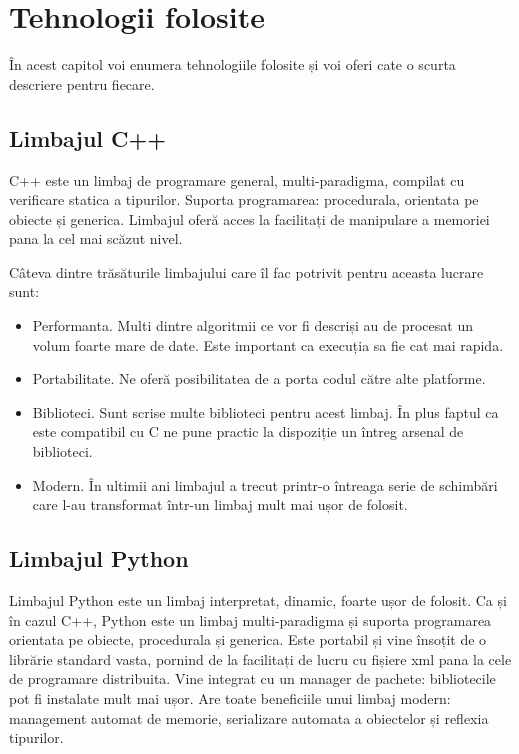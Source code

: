 \chapter{Tehnologii folosite}

În acest capitol voi enumera tehnologiile folosite și voi oferi cate o scurta descriere pentru fiecare.

\section{Limbajul C++}

C++ este un limbaj de programare general, multi-paradigma, compilat cu verificare statica a tipurilor.
Suporta programarea: procedurala, orientata pe obiecte și generica.
Limbajul oferă acces la facilitați de manipulare a memoriei pana la cel mai scăzut nivel.

Câteva dintre trăsăturile limbajului care îl fac potrivit pentru aceasta lucrare sunt:
\begin{itemize}
	\item Performanta. Multi dintre algoritmii ce vor fi descriși au de procesat un volum foarte mare de date. Este important ca execuția sa fie cat mai rapida.
	\item Portabilitate. Ne oferă posibilitatea de a porta codul către alte platforme.
	\item Biblioteci. Sunt scrise multe biblioteci pentru acest limbaj. În plus faptul ca este compatibil cu C ne pune practic la dispoziție un întreg arsenal de biblioteci.
	\item Modern. În ultimii ani limbajul a trecut printr-o întreaga serie de schimbări care l-au transformat într-un limbaj mult mai ușor de folosit.
\end{itemize}


\section{Limbajul Python}

Limbajul Python este un limbaj interpretat, dinamic, foarte ușor de folosit.
Ca și în cazul C++, Python este un limbaj multi-paradigma și suporta programarea orientata pe obiecte, procedurala și generica.
Este portabil și vine însoțit de o librărie standard vasta, pornind de la facilitați de lucru cu fișiere xml pana la cele de programare distribuita.
Vine integrat cu un manager de pachete: bibliotecile pot fi instalate mult mai ușor.
Are toate beneficiile unui limbaj modern: management automat de memorie, serializare automata a obiectelor și reflexia tipurilor.


